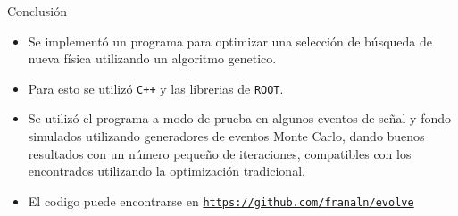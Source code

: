 \documentclass[center,10pt,cm]{beamer}
\begin{document}
\begin{frame}{Conclusi\'on}

  \begin{itemize}\itemsep0.2cm\parskip0.2cm
  \item Se implement\'o un programa para optimizar una selecci\'on de b\'usqueda de nueva f\'isica
    utilizando un algoritmo genetico.
  \item Para esto se utiliz\'o \texttt{C++} y las librerias de \texttt{ROOT}.
  \item Se utiliz\'o el programa a modo de prueba en algunos eventos de se\~nal y fondo simulados
    utilizando generadores de eventos Monte Carlo, dando buenos resultados con un n\'umero
    peque\~no de iteraciones, compatibles con los encontrados utilizando la optimizaci\'on tradicional.

  \item El codigo puede encontrarse en \href{https://github.com/franaln/evolve}{\texttt{https://github.com/franaln/evolve}}

  \end{itemize}


  \end{frame}
\end{document}
